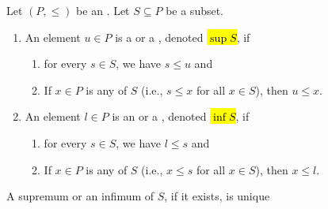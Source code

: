 \begin{definition} \label{definition:supremum_infimum_of_a_subset_of_an_ordered_set}
    Let $(P, \leq )$ be an . Let $S \subseteq P$ be a subset. 
    \begin{enumerate}
        \item An element $u \in P$ is a  or a , denoted \hl{$\sup S$}, if 
        \begin{enumerate}
            \item for every $s \in S$, we have $s \leq u$  and 
            \item If $x \in P$ is any  of $S$ (i.e., $s \leq x$ for all $x \in S$), then $u \leq x$.
        \end{enumerate}

        \item An element $l \in P$ is an  or a , denoted \hl{$\inf S$}, if 
        \begin{enumerate}
            \item for every $s \in S$, we have $l \leq s$  and 
            \item If $x \in P$ is any  of $S$ (i.e., $x \leq s$ for all $x \in S$), then $x \leq l$.
        \end{enumerate}
    \end{enumerate}
    A supremum or an infimum of $S$, if it exists, is unique
\end{definition}